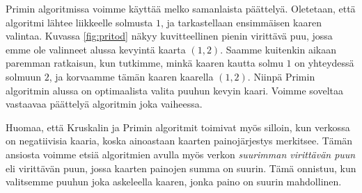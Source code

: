 Primin algoritmissa voimme käyttää melko samanlaista päättelyä.
Oletetaan, että algoritmi lähtee liikkeelle solmusta $1$,
ja tarkastellaan ensimmäisen kaaren valintaa.
Kuvassa \ref{fig:pritod} näkyy kuvitteellinen
pienin virittävä puu, jossa emme ole valinneet alussa
kevyintä kaarta $(1,2)$.
Saamme kuitenkin aikaan paremman ratkaisun,
kun tutkimme, minkä kaaren kautta solmu $1$
on yhteydessä solmuun $2$, ja korvaamme tämän
kaaren kaarella $(1,2)$.
Niinpä Primin algoritmin alussa on optimaalista
valita puuhun kevyin kaari.
Voimme soveltaa vastaavaa päättelyä algoritmin joka vaiheessa.


Huomaa, että Kruskalin ja Primin algoritmit
toimivat myös silloin, kun verkossa on negatiivisia kaaria,
koska ainoastaan kaarten painojärjestys merkitsee.
Tämän ansiosta voimme etsiä algoritmien avulla myös
verkon \emph{suurimman virittävän puun} eli virittävän puun,
jossa kaarten painojen summa on suurin.
Tämä onnistuu, kun valitsemme puuhun joka askeleella kaaren,
jonka paino on suurin mahdollinen.
